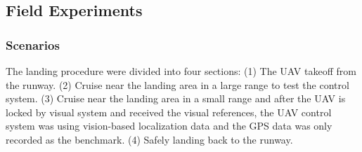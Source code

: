  
 

\subsection{Field Experiments}
\subsubsection{Scenarios}

The landing procedure were divided into four sections: (1) The UAV takeoff from the runway. (2) Cruise near the landing area in a large range to test the control system. (3) Cruise near the landing area in a small range and after the UAV is locked by visual system and received the visual references, the UAV control system was using vision-based localization data and the GPS data was only recorded as the benchmark. (4) Safely landing back to the runway.

 




